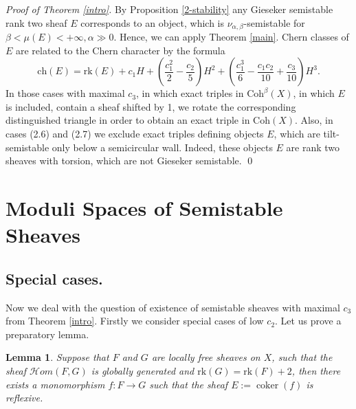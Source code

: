 \documentclass{amsart}
\DeclareMathOperator{\coker}{coker}
\newtheorem{lemma}[theorem]{Lemma}
\begin{document}
	\textit{Proof of Theorem \ref{intro}.} By Proposition \ref{2-stability} any Gieseker semistable rank two sheaf $E$ corresponds to an object, which is $\nu_{\alpha,\beta}$-semistable for $\beta<\mu(E)<+\infty,\alpha\gg0$. Hence, we can apply Theorem \ref{main}. Chern classes of $E$ are related to the Chern character by the formula
	\begin{equation}\label{ch}\mathrm{ch}(E)=\mathrm{rk}(E)+c_1H+\left(\frac{c_1^2}{2}-\frac{c_2}{5}\right)H^2+\left(\frac{c_1^3}{6}-\frac{c_1c_2}{10}+\frac{c_3}{10}\right)H^3.\end{equation}
	In those cases with maximal $c_3$, in which exact triples in $\mathrm{Coh}^\beta(X)$, in which $E$ is included, contain a sheaf shifted by 1, we rotate the corresponding distinguished triangle in order to obtain an exact triple in $\mathrm{Coh}(X)$. Also, in cases (2.6) and (2.7) we exclude exact triples defining objects $E$, which are tilt-semistable only below a semicircular wall. Indeed, these objects $E$ are rank two sheaves with torsion, which are not Gieseker semistable. \qed
	
	\section{Moduli Spaces of Semistable Sheaves}
	\subsection{Special cases.}\label{special} Now we deal with the question of existence of semistable sheaves with maximal $c_3$ from Theorem \ref{intro}. Firstly we consider special cases of low $c_2$. Let us prove a preparatory lemma.
	
	\begin{lemma}\label{reflexive}Suppose that $F$ and $G$ are locally free sheaves on $X$, such that the sheaf $\mathcal Hom(F,G)$ is globally generated and $\mathrm{rk}(G)=\mathrm{rk}(F)+2$, then there exists a monomorphism $f:F\to G$ such that the sheaf $E:=\coker(f)$ is reflexive.
	\end{lemma}
	
\end{document}

